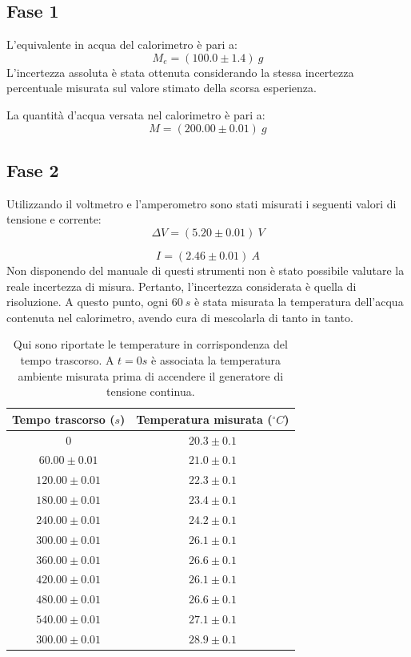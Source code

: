 \subsection{Fase 1}

L'equivalente in acqua del calorimetro è pari a:
\begin{equation}
	M_e = (100.0\pm 1.4)\ g
\end{equation}
L'incertezza assoluta è stata ottenuta considerando la stessa incertezza percentuale misurata sul valore stimato della scorsa esperienza. 

La quantità d'acqua versata nel calorimetro è pari a:
\begin{equation}
	M = (200.00\pm 0.01)\ g
\end{equation}

\subsection{Fase 2}

Utilizzando il voltmetro e l'amperometro sono stati misurati i seguenti valori di tensione e corrente:
\begin{equation}
	\Delta V = (5.20\pm 0.01)\ V
\end{equation}

\begin{equation}
	I = (2.46\pm 0.01)\ A
\end{equation}
Non disponendo del manuale di questi strumenti non è stato possibile valutare la reale incertezza di misura. Pertanto, l'incertezza considerata è quella di risoluzione. A questo punto, ogni $60\ s$ è stata misurata la temperatura dell'acqua contenuta nel calorimetro, avendo cura di mescolarla di tanto in tanto.


\begin{table}[H]
	\centering
	\begin{tabular}{|c|c|}
		\hline
		\textbf{Tempo trascorso ($s$)} & \textbf{Temperatura misurata ($^{\circ}C$)} \\
		\hline
		$0$ & $20.3\pm 0.1$ \\
		\hline
		$60.00\pm 0.01$ & $21.0\pm 0.1$ \\
		\hline
		$120.00\pm 0.01$ & $22.3\pm 0.1$ \\
		\hline
		$180.00\pm 0.01$ & $23.4\pm 0.1$ \\
		\hline
		$240.00\pm 0.01$ & $24.2\pm 0.1$ \\
		\hline
		$300.00\pm 0.01$ & $26.1\pm 0.1$ \\
		\hline
		$360.00\pm 0.01$ & $26.6\pm 0.1$ \\
		\hline
		$420.00\pm 0.01$ & $26.1\pm 0.1$ \\
		\hline
		$480.00\pm 0.01$ & $26.6\pm 0.1$ \\
		\hline
		$540.00\pm 0.01$ & $27.1\pm 0.1$ \\
		\hline
		$300.00\pm 0.01$ & $28.9\pm 0.1$ \\
		\hline
	\end{tabular}
	\caption{Qui sono riportate le temperature in corrispondenza del tempo trascorso. A $t=0s$ è associata la temperatura ambiente misurata prima di accendere il generatore di tensione continua.}
	\label{tab:}
\end{table}

